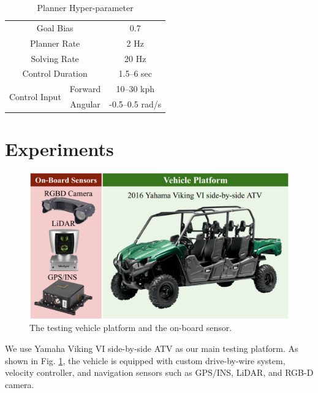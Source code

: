 \documentclass[../thesis.tex]{subfiles}
\begin{document}
\begin{table}[t]
	\centering
	\caption{Planner Hyper-parameter}
	\label{table:rrt-parameters}
	\begin{small}
	\begin{sc}
	\begin{tabular}{ccc}
		\midrule \midrule
		\multicolumn{2}{c}{Goal Bias} & 0.7 \\
		\multicolumn{2}{c}{Planner Rate} & 2 Hz \\
		\multicolumn{2}{c}{Solving Rate} & 20 Hz \\
		\multicolumn{2}{c}{Control Duration} & 1.5--6 sec \\
		\multirow{2}{*}{Control Input} & Forward & 10--30 kph \\
		 								& Angular & -0.5--0.5 rad/s \\ 
		\toprule
	\end{tabular}
	\end{sc}
	\end{small}
\end{table}


\section{Experiments} \label{sec:rrt-experiments}


\begin{figure}[t]
	\begin{center}
		\centerline{\includegraphics[width=0.7\columnwidth]{./RRTPlanner/fig/viking.png}}
		\caption{The testing vehicle platform and the on-board sensor.}
		\label{fig:viking}
	\end{center}
\end{figure} 

We use Yamaha Viking VI side-by-side ATV as our main testing platform. As shown in Fig. \ref{fig:viking}, the vehicle is equipped with custom drive-by-wire system, velocity controller, and navigation sensors such as GPS/INS, LiDAR, and RGB-D camera. 
\end{document}
